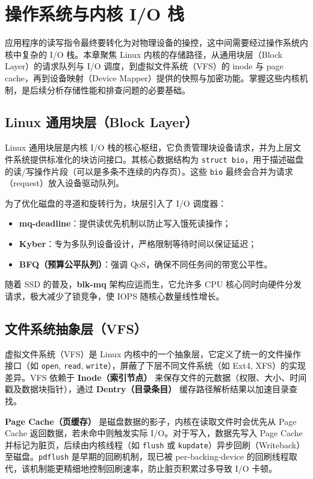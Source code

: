 \documentclass[12pt,UTF8]{ctexbook}
\begin{document}
\chapter{操作系统与内核 I/O 栈}
	
应用程序的读写指令最终要转化为对物理设备的操控，这中间需要经过操作系统内核中复杂的 I/O 栈。本章聚焦 Linux 内核的存储路径，从通用块层（Block Layer）的请求队列与 I/O 调度，到虚拟文件系统（VFS）的 inode 与 page cache，再到设备映射（Device Mapper）提供的快照与加密功能。掌握这些内核机制，是后续分析存储性能和排查问题的必要基础。

\section{Linux 通用块层（Block Layer）}
	
Linux 通用块层是内核 I/O 栈的核心枢纽，它负责管理块设备请求，并为上层文件系统提供标准化的块访问接口。其核心数据结构为 \texttt{struct bio}，用于描述磁盘的读/写操作片段（可以是多条不连续的内存页）。这些 \texttt{bio} 最终会合并为请求（request）放入设备驱动队列。
	
为了优化磁盘的寻道和旋转行为，块层引入了 I/O 调度器：

\begin{itemize}
\item \textbf{mq-deadline}：提供读优先机制以防止写入饿死读操作；
\item \textbf{Kyber}：专为多队列设备设计，严格限制等待时间以保证延迟；
\item \textbf{BFQ（预算公平队列）}：强调 QoS，确保不同任务间的带宽公平性。
\end{itemize}

随着 SSD 的普及，\textbf{blk-mq} 架构应运而生，它允许多 CPU 核心同时向硬件分发请求，极大减少了锁竞争，使 IOPS 随核心数量线性增长。
	
\section{文件系统抽象层（VFS）}
	
虚拟文件系统（VFS）是 Linux 内核中的一个抽象层，它定义了统一的文件操作接口（如 \texttt{open}, \texttt{read}, \texttt{write}），屏蔽了下层不同文件系统（如 Ext4, XFS）的实现差异。VFS 依赖于 \textbf{Inode（索引节点）} 来保存文件的元数据（权限、大小、时间戳及数据块指针），通过 \textbf{Dentry（目录条目）} 缓存路径解析结果以加速目录查找。
	
\textbf{Page Cache（页缓存）} 是磁盘数据的影子，内核在读取文件时会优先从 Page Cache 返回数据，若未命中则触发实际 I/O。对于写入，数据先写入 Page Cache 并标记为脏页，后续由内核线程（如 \texttt{flush} 或 \texttt{kupdate}）异步回刷（Writeback）至磁盘。\texttt{pdflush} 是早期的回刷机制，现已被 per-backing-device 的回刷线程取代，该机制能更精细地控制回刷速率，防止脏页积累过多导致 I/O 卡顿。
	
\end{document}
